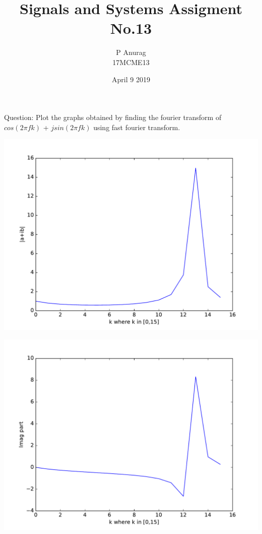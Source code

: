 \documentclass[a4paper,10pt]{article}
\begin{document}
\title{Signals and Systems Assigment No.13}
\author{P Anurag\\17MCME13}

\date{April 9 2019}
\maketitle
Question: Plot the graphs obtained by finding the fourier transform of $cos(2\pi fk)$ + $j sin(2\pi fk)$ using fast fourier transform.
\begin{center}
 \includegraphics[scale=.5]{fig2.pdf}
\end{center}\begin{center}
 \includegraphics[scale=.5]{fig4.pdf}
\end{center}
\end{document}
